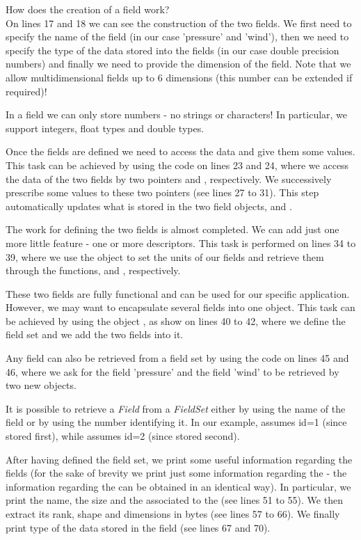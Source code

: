 How does the creation of a field work?\\
On lines 17 and 18 we can see the construction of the two fields.
We first need to specify the name of the field (in our case 'pressure' 
and 'wind'), then we need to specify the type of the data stored 
into the fields (in our case double precision numbers) and finally 
we need to provide the dimension of the field.
Note that we allow multidimensional fields up to 6 dimensions 
(this number can be extended if required)!
%
\begin{tipbox}
In a field we can only store numbers - no strings or characters!
In particular, we support integers, float types and double types.
\end{tipbox}
%
Once the fields are defined we need to access the data 
and give them some values. This task can be achieved 
by using the code on lines 23 and 24, where we access 
the data of the two fields by two pointers  and 
, respectively. 
We successively prescribe some values to these two pointers 
(see lines 27 to 31). This step automatically updates what 
is stored in the two field objects,  
and .

The work for defining the two fields is almost completed.
We can add just one more little feature - one or more 
descriptors. This task is performed on lines 34 to 39, 
where we use the  object to set the units 
of our fields and retrieve them through the functions, 
 and , respectively.

These two fields are fully functional and can be used 
for our specific application. However, we may want to 
encapsulate several fields into one object. This task 
can be achieved by using the object , 
as show on lines 40 to 42, where we define the field 
set and we add the two fields into it.

Any field can also be retrieved from a field set by 
using the code on lines 45 and 46, where we ask for 
the field 'pressure' and the field 'wind' to be retrieved 
by two new  objects.
%
\begin{notebox}
It is possible to retrieve a \emph{Field} from a \emph{FieldSet} 
either by using the name of the field or by using 
the number identifying it. In our example,  
assumes id=1 (since stored first), while 
assumes id=2 (since stored second).
\end{notebox}
%
After having defined the field set, we print some 
useful information regarding the fields (for the sake of 
brevity we print just some information regarding the 
- the information regarding the  can 
be obtained in an identical way).
In particular, we print the name, the size and the 
associated to the  (see lines 51 to 55).
We then extract its rank, shape and dimensions in bytes
(see lines 57 to 66). We finally print type of the data
stored in the field (see lines 67 and 70).

